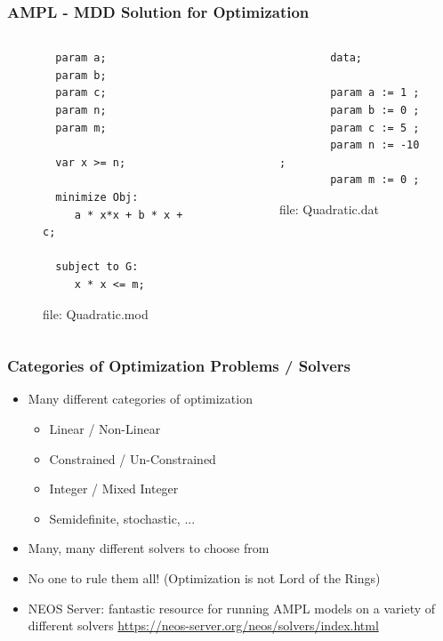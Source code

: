 \documentclass[presentation]{beamer}
\begin{document}
\begin{frame}[fragile]
  \frametitle{AMPL - MDD Solution for Optimization}
  \begin{columns}
    \begin{column}{0.5\textwidth}
      \begin{figure}
\begin{lstlisting}
  param a;
  param b;
  param c;
  param n;
  param m;

  var x >= n;

  minimize Obj:
     a * x*x + b * x + c;

  subject to G:
     x * x <= m;
   \end{lstlisting}
   \caption{file: Quadratic.mod}
   \end{figure}
    \end{column}
    \begin{column}{0.5\textwidth}
      \begin{figure}
      \begin{lstlisting}
        data;

        param a := 1 ;
        param b := 0 ;
        param c := 5 ;
        param n := -10 ;
        param m := 0 ;
      \end{lstlisting}
      \caption{file: Quadratic.dat}
      \end{figure}
    \end{column}
   \end{columns}
\end{frame}

\begin{frame}
  \frametitle{Categories of Optimization Problems / Solvers}

  \begin{itemize}
  \item Many different categories of optimization
    \begin{itemize}
    \item Linear / Non-Linear
    \item Constrained / Un-Constrained
    \item Integer / Mixed Integer
    \item Semidefinite, stochastic, ...
    \end{itemize}
  \item Many, many different solvers to choose from
  \item No one to rule them all! (Optimization is not Lord of the Rings)
  \item NEOS Server: fantastic resource for running AMPL models on a variety of
    different solvers
    \url{https://neos-server.org/neos/solvers/index.html}
  \end{itemize}
\end{frame}
\end{document}
